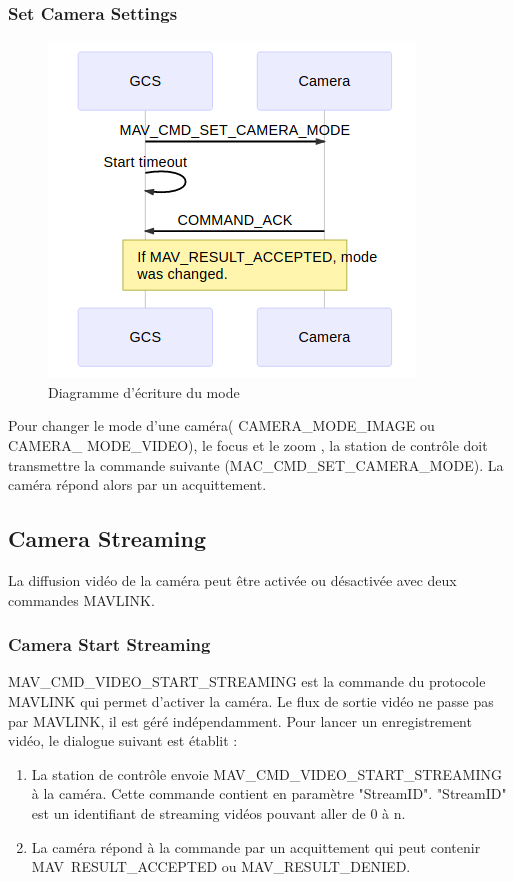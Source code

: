 \subsubsection{Set Camera Settings}
\begin{figure}[ht]
    \centering
    \includegraphics[scale=0.7]{img/camSetparams.png}
    \caption{Diagramme d'écriture du mode}
    \label{fig:CameraCmdsettings}
\end{figure}

Pour changer le mode d'une caméra( CAMERA\_MODE\_IMAGE ou CAMERA\_
MODE\_VIDEO), le focus et le zoom ,  la station de contrôle doit transmettre la commande suivante (MAC\_CMD\_SET\_CAMERA\_MODE). La caméra répond alors par un acquittement. 

\subsection{Camera Streaming}
La diffusion vidéo de la caméra peut être activée ou désactivée avec deux commandes MAVLINK.

\subsubsection{Camera Start Streaming}
MAV\_CMD\_VIDEO\_START\_STREAMING est la commande du protocole MAVLINK qui permet d'activer la caméra. Le flux de sortie vidéo ne passe pas par MAVLINK, il est géré indépendamment. 
Pour lancer un enregistrement vidéo, le dialogue suivant est établit : 
\begin{enumerate}
    \item La station de contrôle envoie MAV\_CMD\_VIDEO\_START\_STREAMING à la caméra. Cette commande contient en paramètre "StreamID". "StreamID" est un identifiant de streaming vidéos pouvant aller de 0 à n.
    \item La caméra répond à la commande par un acquittement qui peut contenir MAV\
    RESULT\_ACCEPTED ou MAV\_RESULT\_DENIED. 
\end{enumerate}
